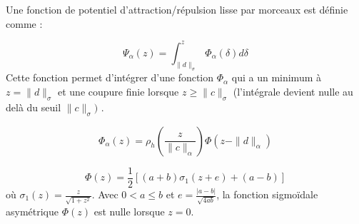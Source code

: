 \noindent Une fonction de potentiel d'attraction/répulsion lisse par morceaux est définie comme :

\begin{equation}
  \Psi_{\alpha}(z) = \int_{\|d\|_{\sigma}}^{z} \Phi_{\alpha}(\delta) d\delta 
\end{equation}
Cette fonction permet d'intégrer d'une fonction \(\Phi_{\alpha}\) qui a un minimum à \(z = \|d\|_{\sigma}\) et une coupure finie lorsque \(z \geq \|c\|_{\sigma}\) (l'intégrale devient nulle au delà du seuil $\|c\|_{\sigma})$ . 


\begin{equation}
\Phi_{\alpha}(z) = \rho_h\left(\frac{z}{\|c\|_{\alpha}}\right) \Phi(z - \|d\|_{\alpha})    
\end{equation}

\begin{equation}
\Phi(z) = \frac{1}{2} \left[ (a + b) \sigma_1(z + e) + (a - b) \right]
\end{equation}
où \(\sigma_1(z) = \frac{z}{\sqrt{1 + z^2}}\).
Avec \(0 < a \leq b\) et \(e = \frac{|a - b|}{\sqrt{4ab}}\), la fonction sigmoïdale asymétrique \(\Phi(z)\) est nulle lorsque \(z = 0\).